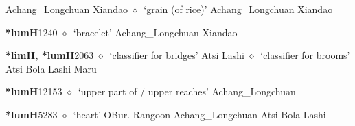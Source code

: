 \begin{list}{}{\leftmargin=1.5em \itemindent=-1.5em}
         Achang\_Longchuan 
\hspace{1ex}
         Xiandao 
\hspace{1ex}
         $\diamond$~`grain (of rice)'
         Achang\_Longchuan 
\hspace{1ex}
         Xiandao 
  \item {\footnotesize \textbf{*lumH}}{\tiny 1240}
\hspace{1ex}
         $\diamond$~`bracelet'
         Achang\_Longchuan 
\hspace{1ex}
         Xiandao 
  \item {\footnotesize \textbf{*limH, *lumH}}{\tiny 2063}
\hspace{1ex}
         $\diamond$~`classifier for bridges'
         Atsi 
\hspace{1ex}
         Lashi 
\hspace{1ex}
         $\diamond$~`classifier for brooms'
         Atsi 
\hspace{1ex}
         Bola 
\hspace{1ex}
         Lashi 
\hspace{1ex}
         Maru 
  \item {\footnotesize \textbf{*lumH}}{\tiny 12153}
\hspace{1ex}
         $\diamond$~`upper part of / upper reaches'
         Achang\_Longchuan 
  \item {\footnotesize \textbf{*lumH}}{\tiny 5283}
\hspace{1ex}
         $\diamond$~`heart'
         OBur. 
\hspace{1ex}
         Rangoon 
\hspace{1ex}
         Achang\_Longchuan 
\hspace{1ex}
         Atsi 
\hspace{1ex}
         Bola 
\hspace{1ex}
         Lashi 

\end{list}
